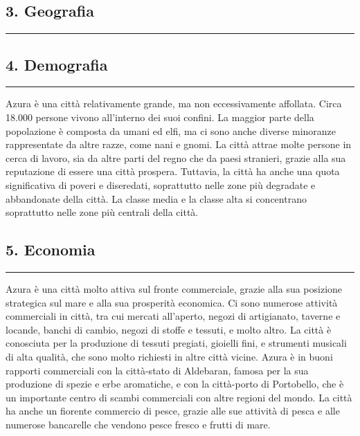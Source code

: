 \subsection{3. Geografia}\label{geografia}

\begin{center}\rule{0.5\linewidth}{0.5pt}\end{center}

\subsection{4. Demografia}\label{demografia}

\begin{center}\rule{0.5\linewidth}{0.5pt}\end{center}

Azura è una città relativamente grande, ma non eccessivamente affollata.
Circa 18.000 persone vivono all'interno dei suoi confini. La maggior
parte della popolazione è composta da umani ed elfi, ma ci sono anche
diverse minoranze rappresentate da altre razze, come nani e gnomi. La
città attrae molte persone in cerca di lavoro, sia da altre parti del
regno che da paesi stranieri, grazie alla sua reputazione di essere una
città prospera. Tuttavia, la città ha anche una quota significativa di
poveri e diseredati, soprattutto nelle zone più degradate e abbandonate
della città. La classe media e la classe alta si concentrano soprattutto
nelle zone più centrali della città.

\subsection{5. Economia}\label{economia}

\begin{center}\rule{0.5\linewidth}{0.5pt}\end{center}

Azura è una città molto attiva sul fronte commerciale, grazie alla sua
posizione strategica sul mare e alla sua prosperità economica. Ci sono
numerose attività commerciali in città, tra cui mercati all'aperto,
negozi di artigianato, taverne e locande, banchi di cambio, negozi di
stoffe e tessuti, e molto altro. La città è conosciuta per la produzione
di tessuti pregiati, gioielli fini, e strumenti musicali di alta
qualità, che sono molto richiesti in altre città vicine. Azura è in
buoni rapporti commerciali con la città-stato di Aldebaran, famosa per
la sua produzione di spezie e erbe aromatiche, e con la città-porto di
Portobello, che è un importante centro di scambi commerciali con altre
regioni del mondo. La città ha anche un fiorente commercio di pesce,
grazie alle sue attività di pesca e alle numerose bancarelle che vendono
pesce fresco e frutti di mare.

